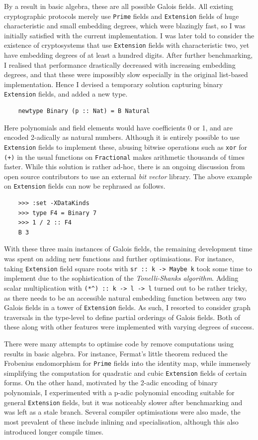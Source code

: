 \documentclass[11pt]{article}
\begin{document}
By a result in basic algebra, these are all possible Galois fields. All existing cryptographic protocols merely use \texttt{Prime} fields and \texttt{Extension} fields of huge characteristic and small embedding degrees, which were blazingly fast, so I was initially satisfied with the current implementation. I was later told to consider the existence of cryptosystems that use \texttt{Extension} fields with characteristic two, yet have embedding degrees of at least a hundred digits. After further benchmarking, I realised that performance drastically decreased with increasing embedding degrees, and that these were impossibly slow especially in the original list-based implementation. Hence I devised a temporary solution capturing binary \texttt{Extension} fields, and added a new type.
\begin{verbatim}
    newtype Binary (p :: Nat) = B Natural
\end{verbatim}
Here polynomials and field elements would have coefficients 0 or 1, and are encoded 2-adically as natural numbers. Although it is entirely possible to use \texttt{Extension} fields to implement these, abusing bitwise operations such as \texttt{xor} for \texttt{(+)} in the usual functions on \texttt{Fractional} makes arithmetic thousands of times faster. While this solution is rather ad-hoc, there is an ongoing discussion from open source contributors to use an external \emph{bit vector} library. The above example on \texttt{Extension} fields can now be rephrased as follows.
\begin{verbatim}
    >>> :set -XDataKinds
    >>> type F4 = Binary 7
    >>> 1 / 2 :: F4
    B 3
\end{verbatim}

With these three main instances of Galois fields, the remaining development time was spent on adding new functions and further optimisations. For instance, taking \texttt{Extension} field square roots with \texttt{sr :: k -> Maybe k} took some time to implement due to the sophistication of the \emph{Tonelli-Shanks algorithm}. Adding scalar multiplication with \texttt{(*\^{}) :: k -> l -> l} turned out to be rather tricky, as there needs to be an accessible natural embedding function between any two Galois fields in a tower of \texttt{Extension} fields. As such, I resorted to consider graph traversals in the type-level to define partial orderings of Galois fields. Both of these along with other features were implemented with varying degrees of success.

There were many attempts to optimise code by remove computations using results in basic algebra. For instance, Fermat's little theorem reduced the Frobenius endomorphism for \texttt{Prime} fields into the identity map, while immensely simplifying the computation for quadratic and cubic \texttt{Extension} fields of certain forms. On the other hand, motivated by the 2-adic encoding of binary polynomials, I experimented with a p-adic polynomial encoding suitable for general \texttt{Extension} fields, but it was noticeably slower after benchmarking and was left as a stale branch. Several compiler optimisations were also made, the most prevalent of these include inlining and specialisation, although this also introduced longer compile times.
\end{document}
